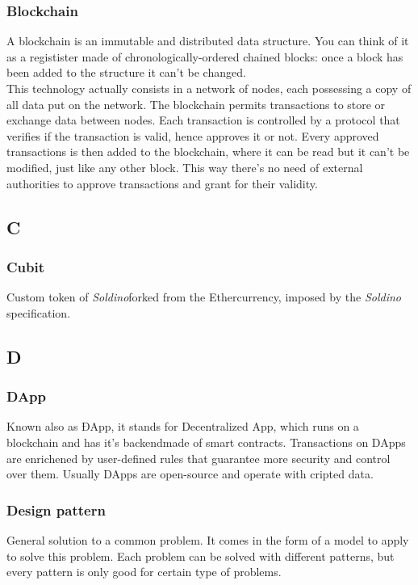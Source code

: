 \subsubsection*{Blockchain}
A blockchain is an immutable and distributed data structure. You can think of it as a registister made of chronologically-ordered chained blocks: once a block has been added to the structure it can't be changed. \\
This technology actually consists in a network of nodes, each possessing a copy of all data put on the network.
The blockchain permits transactions to store or exchange data between nodes. Each transaction is controlled by a protocol that verifies if the transaction is valid, hence approves it or not. Every approved transactions is then added to the blockchain, where it can be read but it can't be modified, just like any other block.
This way there's no need of external authorities to approve transactions and grant for their validity.


\subsection*{C}

\subsubsection*{Cubit}
Custom token of \textit{Soldino}\glosp forked from the Ether\glosp currency, imposed by the \textit{Soldino} specification.


\subsection*{D}

\subsubsection*{DApp}

Known also as ÐApp, it stands for Decentralized App, which runs on a blockchain and has it's backend\glosp made of smart contracts\glo. Transactions on DApps are enrichened by user-defined rules that guarantee more security and control over them. Usually DApps are open-source and operate with cripted data.

\subsubsection*{Design pattern}
General solution to a common problem. It comes in the form of a model to apply to solve this problem. Each problem can be solved with different patterns, but every pattern is only good for certain type of problems.


